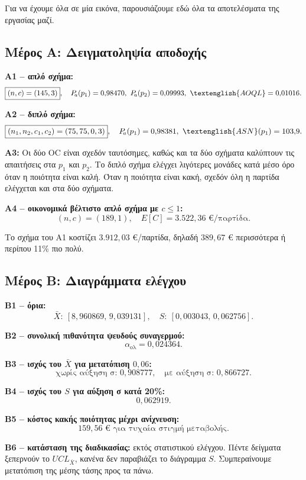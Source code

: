 \documentclass[12pt,a4paper]{article}
\newcommand{\Pa}{P_{\!a}}
\newcommand{\AOQL}{\textenglish{AOQL}}
\newcommand{\ASN}{\textenglish{ASN}}
\begin{document}
Για να έχουμε όλα σε μία εικόνα, παρουσιάζουμε εδώ όλα τα αποτελέσματα της
εργασίας μαζί.

\subsection*{Μέρος Α: Δειγματοληψία αποδοχής}

\textbf{A1 -- απλό σχήμα:}
\[
    \boxed{(n,c)=(145,3)},\quad \Pa(p_1)=0{,}98470,\ \Pa(p_2)=0{,}09993,\ \AOQL=0{,}01016.
\]

\textbf{A2 -- διπλό σχήμα:}
\[
    \boxed{(n_1,n_2,c_1,c_2)=(75,75,0,3)},\quad \Pa(p_1)=0{,}98381,\ \ASN(p_1)=103{,}9.
\]

\textbf{A3:} Οι δύο OC είναι σχεδόν ταυτόσημες, καθώς και τα δύο σχήματα
καλύπτουν τις απαιτήσεις στα \(p_1\) και \(p_2\). Το διπλό σχήμα ελέγχει
λιγότερες μονάδες κατά μέσο όρο όταν η ποιότητα είναι καλή. Όταν η ποιότητα
είναι κακή, σχεδόν όλη η παρτίδα ελέγχεται και στα δύο σχήματα.

\textbf{A4 -- οικονομικά βέλτιστο απλό σχήμα με \(c\le 1\):}
\[
    \boxed{(n,c)=(189,1)},\quad E[C]=3.522{,}36 \text{ €/παρτίδα}.
\]

Το σχήμα του Α1 κοστίζει \(3.912{,}03\) €/παρτίδα, δηλαδή \(389{,}67\) €
περισσότερα ή περίπου 11\% πιο πολύ.

\subsection*{Μέρος Β: Διαγράμματα ελέγχου}

\textbf{B1 -- όρια:}
\[
    \bar X:\ [8{,}960869,\,9{,}039131],\quad
    S:\ [0{,}003043,\,0{,}062756].
\]

\textbf{B2 -- συνολική πιθανότητα ψευδούς συναγερμού:}
\[
    \boxed{\alpha_{\text{ολ}}=0{,}024364}.
\]

\textbf{B3 -- ισχύς του \(\bar X\) για μετατόπιση \(0{,}06\):}
\[
    \boxed{\text{χωρίς αύξηση σ: } 0{,}908777,\quad \text{με αύξηση σ: } 0{,}866727}.
\]

\textbf{B4 -- ισχύς του \(S\) για αύξηση σ κατά 20\%:}
\[
    \boxed{0{,}062919}.
\]

\textbf{B5 -- κόστος κακής ποιότητας μέχρι ανίχνευση:}
\[
    \boxed{159{,}56 \text{ € για τυχαία στιγμή μεταβολής}}.
\]

\textbf{B6 -- κατάσταση της διαδικασίας:} εκτός στατιστικού ελέγχου.
Πέντε δείγματα ξεπερνούν το \(UCL_{\bar X}\), κανένα δεν παραβιάζει το
διάγραμμα \(S\). Συμπεραίνουμε μετατόπιση της μέσης τάσης προς τα πάνω.
\end{document}

